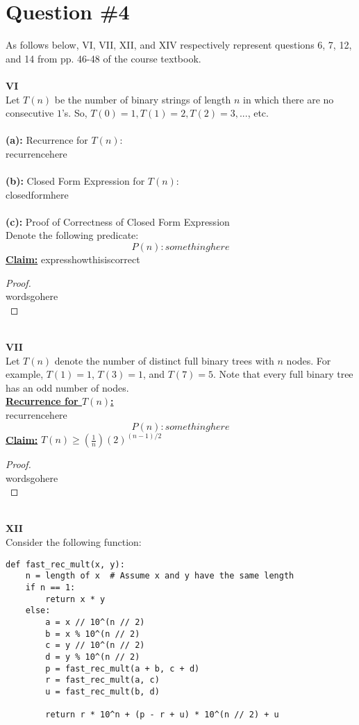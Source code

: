 \documentclass[12pt]{article}
\begin{document}
\section*{Question \#4}
As follows below, VI, VII, XII, and XIV respectively represent questions 6, 7, 12, and 14 from pp. 46-48 of the course textbook. \\
\\
\textbf{VI} \\
Let $T(n)$ be the number of binary strings of length $n$ in which there are no consecutive $1$'s. So, \(T(0) = 1, T(1) = 2, T(2) = 3, ...\), etc. \\
\\
\textbf{(a):} Recurrence for $T(n)$: \\
recurrencehere \\
\\
\textbf{(b):} Closed Form Expression for $T(n)$: \\
closedformhere \\
\\
\textbf{(c):} Proof of Correctness of Closed Form Expression \\
Denote the following predicate: \\
\[P(n): somethinghere\]
\textbf{\underline{Claim:}} expresshowthisiscorrect
\begin{proof}
\leavevmode\\
    wordsgohere \\
\end{proof}
\leavevmode\\
\textbf{VII} \\
Let $T(n)$ denote the number of distinct full binary trees with $n$ nodes. For example, $T(1) = 1$, $T(3) = 1$, and $T(7) = 5$. Note that every full binary tree has an odd number of nodes. \\
\textbf{\underline{Recurrence for $T(n)$:}} \\
recurrencehere \\
\[P(n): somethinghere\]
\large \textbf{\underline {Claim:}} \(T(n) \geq (\frac{1}{n})(2)^{(n - 1) / 2}\)
\normalsize
\begin{proof}
\leavevmode\\
    wordsgohere \\
\end{proof}
\leavevmode\\
\textbf{XII} \\
Consider the following function:
\begin{lstlisting}
def fast_rec_mult(x, y):
    n = length of x  # Assume x and y have the same length
    if n == 1:
        return x * y
    else:
        a = x // 10^(n // 2)
        b = x % 10^(n // 2)
        c = y // 10^(n // 2)
        d = y % 10^(n // 2)
        p = fast_rec_mult(a + b, c + d)
        r = fast_rec_mult(a, c)
        u = fast_rec_mult(b, d)

        return r * 10^n + (p - r + u) * 10^(n // 2) + u
\end{lstlisting}
\end{document}

